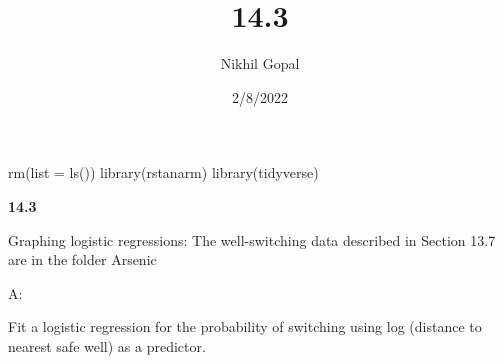 \documentclass[
]{article}
\title{14.3}
\author{Nikhil Gopal}
\date{2/8/2022}
\newenvironment{Shaded}{\begin{snugshade}}{\end{snugshade}}
\newcommand{\AttributeTok}[1]{\textcolor[rgb]{0.77,0.63,0.00}{#1}}
\newcommand{\ControlFlowTok}[1]{\textcolor[rgb]{0.13,0.29,0.53}{\textbf{#1}}}
\newcommand{\DecValTok}[1]{\textcolor[rgb]{0.00,0.00,0.81}{#1}}
\newcommand{\FunctionTok}[1]{\textcolor[rgb]{0.00,0.00,0.00}{#1}}
\newcommand{\NormalTok}[1]{#1}
\newcommand{\OtherTok}[1]{\textcolor[rgb]{0.56,0.35,0.01}{#1}}
\newcommand{\SpecialCharTok}[1]{\textcolor[rgb]{0.00,0.00,0.00}{#1}}
\newcommand{\StringTok}[1]{\textcolor[rgb]{0.31,0.60,0.02}{#1}}
\begin{document}
\maketitle

\begin{Shaded}
\begin{Highlighting}[]
\FunctionTok{rm}\NormalTok{(}\AttributeTok{list =} \FunctionTok{ls}\NormalTok{())}
\FunctionTok{library}\NormalTok{(rstanarm)}
\FunctionTok{library}\NormalTok{(tidyverse)}
\end{Highlighting}
\end{Shaded}

\textbf{14.3}

Graphing logistic regressions: The well-switching data described in
Section 13.7 are in the folder Arsenic

A:

Fit a logistic regression for the probability of switching using log
(distance to nearest safe well) as a predictor.

\begin{Shaded}
\end{Shaded}
\end{document}
